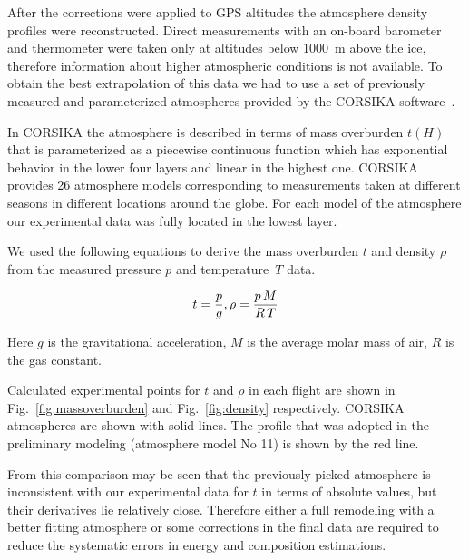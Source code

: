 \documentclass[final,5p,times,twocolumn]{elsarticle}
\begin{document}

After the corrections were applied to GPS altitudes the atmosphere density profiles were reconstructed. Direct measurements with an on-board barometer and thermometer were taken only at altitudes below 1000~m above the ice, therefore information about higher atmospheric conditions is not available. To obtain the best extrapolation of this data we had to use a set of previously measured and parameterized atmospheres provided by the CORSIKA software~\cite{hec98}.

In CORSIKA the atmosphere is described in terms of mass overburden $t(H)$ that is parameterized as a piecewise continuous function which has exponential behavior in the lower four layers and linear in the highest one. %
CORSIKA provides 26 atmosphere models corresponding to measurements taken at different seasons in different locations around the globe. For each model of the atmosphere our experimental data was fully located in the lowest layer.

We used the following equations to derive the mass overburden $t$ and density $\rho$ from the measured pressure $p$ and temperature~$T$ data.

\begin{equation}
t     = \frac{p}{g}, \\
\rho  = \frac{p \, M}{R \, T} \\
\end{equation}

Here $g$ is the gravitational acceleration, $M$ is the average molar mass of air, $R$ is the gas constant.

Calculated experimental points for $t$ and $\rho$ in each flight are shown in Fig.~\ref{fig:massoverburden} and Fig.~\ref{fig:density} respectively. CORSIKA atmospheres are shown with solid lines. The profile that was adopted in the preliminary modeling (atmosphere model No 11) is shown by the red line.

From this comparison may be seen that the previously picked atmosphere is inconsistent with our experimental data for $t$ in terms of absolute values, but their derivatives lie relatively close. Therefore either a full remodeling with a better fitting atmosphere or some corrections in the final data are required to reduce the systematic errors in energy and composition estimations.
\end{document}
